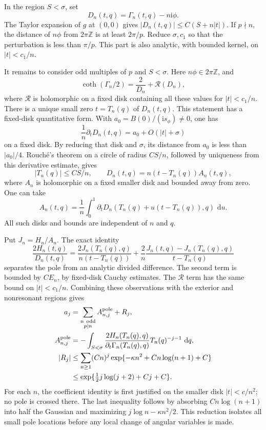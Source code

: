 \documentclass[11pt]{article}
\numberwithin{equation}{section}
\theoremstyle{definition}
\newcommand{\Z}{\mathbb Z}
\newcommand{\ii}{\mathrm i}
\newcommand{\dd}{\,\mathrm d}
\begin{document}
In the region \(S<\sigma\), set
\[
 D_n(t,q)=\Gamma_n(t,q)-n\ii\phi .
 \]
The Taylor expansion of \(g\) at \((0,0)\) gives
\(|D_n(t,q)|\le C(S+n|t|)\).
If \(p\nmid n\), the distance of \(n\phi\) from \(2\pi\Z\) is at
least \(2\pi/p\).  Reduce \(\sigma,c_1\) so that the perturbation
is less than \(\pi/p\).  This part is also analytic, with bounded
kernel, on \(|t|<c_1/n\).

It remains to consider odd multiples of \(p\) and \(S<\sigma\).
Here \(n\phi\in2\pi\Z\), and
\[
 \coth(\Gamma_n/2)=\frac2{D_n}+\mathcal R(D_n),
 \]
where \(\mathcal R\) is holomorphic on a fixed disk containing all
these values for \(|t|<c_1/n\).
There is a unique small zero \(t=T_n(q)\) of \(D_n(t,q)\).
This statement has a fixed-disk quantitative form.  With
\(a_0=B(0)/(\ii s_\phi)\ne0\), one has
\[
 \frac1n\partial_tD_n(t,q)=a_0+O(|t|+\sigma)
 \]
on a fixed disk.  By reducing that disk and \(\sigma\), its
distance from \(a_0\) is less than \(|a_0|/4\).  Rouch\'e's
theorem on a circle of radius \(CS/n\), followed by uniqueness
from this derivative estimate, gives
\begin{equation}
 |T_n(q)|\le CS/n,\qquad
 D_n(t,q)=n(t-T_n(q))A_n(t,q),
 \label{neg:pole-factor}
\end{equation}
where \(A_n\) is holomorphic on a fixed smaller disk and bounded
away from zero.  One can take
\[
 A_n(t,q)=\frac1n\int_0^1
   \partial_tD_n(T_n(q)+u(t-T_n(q)),q)\,\dd u .
 \]
All such disks and bounds are independent of \(n\) and \(q\).

Put \(J_n=H_n/A_n\).  The exact identity
\begin{equation}
 \frac{2H_n(t,q)}{D_n(t,q)}
 =\frac{2J_n(T_n(q),q)}{n(t-T_n(q))}
  +\frac2n
     \frac{J_n(t,q)-J_n(T_n(q),q)}{t-T_n(q)}
 \label{neg:division}
\end{equation}
separates the pole from an analytic divided difference.
The second term is bounded by \(CE_n\), by fixed-disk Cauchy
estimates.  The \(\mathcal R\) term has the same bound on
\(|t|<c_1/n\).  Combining these observations with the exterior
and nonresonant regions gives
\begin{align}
 a_j&=
 \sum_{\substack{n\ {\rm odd}\\p\mid n}}A^{\rm pole}_{n,j}+R_j,
 \label{neg:all-poles}\\
 A^{\rm pole}_{n,j}
 &=-\int_{S<\sigma}
   \frac{2H_n(T_n(q),q)}
        {\partial_t\Gamma_n(T_n(q),q)}
   T_n(q)^{-j-1}\,\dd q ,
 \label{neg:pole-coefficient}\\
 |R_j|
 &\le \sum_{n\ge1}(Cn)^j
             \exp\{-\kappa n^2+C n\log(n+1)+C\}\\
 &\le
 \exp\{\tfrac12 j\log(j+2)+Cj+C\}.
 \label{neg:regular-remainder}
\end{align}
For each \(n\), the coefficient identity is first justified on
the smaller disk \(|t|<c/n^2\); no pole is crossed there.
The last inequality follows by absorbing \(Cn\log(n+1)\) into
half the Gaussian and maximizing \(j\log n-\kappa n^2/2\).
This reduction isolates all small pole locations before any local
change of angular variables is made.
\end{document}
